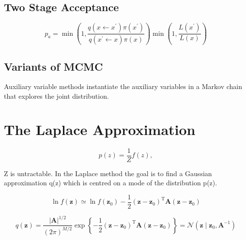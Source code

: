 \documentclass{article}
\begin{document}
\subsection{Two Stage Acceptance}
\begin{equation}
    p_{a}=\min \left(1, \frac{q\left(x \leftarrow x^{\prime}\right) \pi\left(x^{\prime}\right)}{q\left(x^{\prime} \leftarrow x\right) \pi(x)}\right) \min \left(1, \frac{L\left(x^{\prime}\right)}{L(x)}\right)
\end{equation}

\subsection{Variants of MCMC}
Auxiliary variable methods instantiate the auxiliary variables in a Markov chain that explores the joint distribution.

\section{The Laplace Approximation}
\begin{equation}
    p(z)=\frac{1}{Z} f(z),
\end{equation}

Z is untractable. In the Laplace method the goal is to ﬁnd a Gaussian approximation q(z) which is centred on a mode of the distribution p(z).

\begin{equation}
    \ln f(\mathbf{z}) \simeq \ln f\left(\mathbf{z}_{0}\right)-\frac{1}{2}\left(\mathbf{z}-\mathbf{z}_{0}\right)^{\mathrm{T}} \mathbf{A}\left(\mathbf{z}-\mathbf{z}_{0}\right)
\end{equation}

\begin{equation}
    q(\mathbf{z})=\frac{|\mathbf{A}|^{1 / 2}}{(2 \pi)^{M / 2}} \exp \left\{-\frac{1}{2}\left(\mathbf{z}-\mathbf{z}_{0}\right)^{\mathrm{T}} \mathbf{A}\left(\mathbf{z}-\mathbf{z}_{0}\right)\right\}=\mathcal{N}\left(\mathbf{z} \mid \mathbf{z}_{0}, \mathbf{A}^{-1}\right)
    \end{equation}  


\appendix
\end{document}

